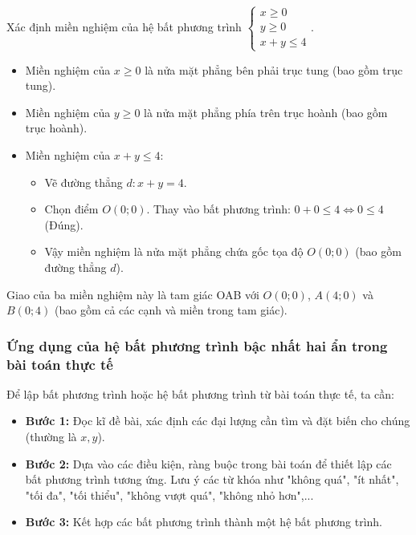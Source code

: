 \begin{emcothe}
Xác định miền nghiệm của hệ bất phương trình $\begin{cases} x \ge 0 \\ y \ge 0 \\ x + y \le 4 \end{cases}$.
\begin{itemize}
    \item Miền nghiệm của $x \ge 0$ là nửa mặt phẳng bên phải trục tung (bao gồm trục tung).
    \item Miền nghiệm của $y \ge 0$ là nửa mặt phẳng phía trên trục hoành (bao gồm trục hoành).
    \item Miền nghiệm của $x + y \le 4$:
    \begin{itemize}
        \item Vẽ đường thẳng $d: x + y = 4$.
        \item Chọn điểm $O(0; 0)$. Thay vào bất phương trình: $0 + 0 \le 4 \Leftrightarrow 0 \le 4$ (Đúng).
        \item Vậy miền nghiệm là nửa mặt phẳng chứa gốc tọa độ $O(0; 0)$ (bao gồm đường thẳng $d$).
    \end{itemize}
\end{itemize}
Giao của ba miền nghiệm này là tam giác OAB với $O(0;0)$, $A(4;0)$ và $B(0;4)$ (bao gồm cả các cạnh và miền trong tam giác).
\end{emcothe}

\subsubsection{Ứng dụng của hệ bất phương trình bậc nhất hai ẩn trong bài toán thực tế}

\begin{kienthuc}
Để lập bất phương trình hoặc hệ bất phương trình từ bài toán thực tế, ta cần:
\begin{itemize}
    \item \textbf{Bước 1:} Đọc kĩ đề bài, xác định các đại lượng cần tìm và đặt biến cho chúng (thường là $x, y$).
    \item \textbf{Bước 2:} Dựa vào các điều kiện, ràng buộc trong bài toán để thiết lập các bất phương trình tương ứng. Lưu ý các từ khóa như "không quá", "ít nhất", "tối đa", "tối thiểu", "không vượt quá", "không nhỏ hơn",...
    \item \textbf{Bước 3:} Kết hợp các bất phương trình thành một hệ bất phương trình.
\end{itemize}
\end{kienthuc}

